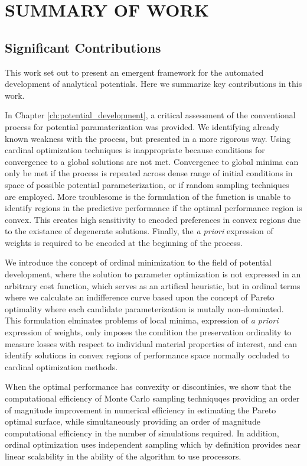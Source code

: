 \chapter{SUMMARY OF WORK}
\label{ch:summary}

\section{Significant Contributions}
This work set out to present an emergent framework for the automated development of analytical potentials.  Here we summarize key contributions in this work.

In Chapter \ref{ch:potential_development}, a critical assessment of the conventional process for potential paramaterization was provided.  We identifying already known weakness with the process, but presented in a more rigorous way.  Using cardinal optimization techniques is inappropriate because conditions for convergence to a global solutions are not met.  Convergence to global minima can only be met if the process is repeated across dense range of initial conditions in space of possible potential parameterization, or if random sampling techniques are employed.  More troublesome is the formulation of the function is unable to identify regions in the predictive performance if the optimal performance region is convex.  This creates high sensitivity to encoded preferences in convex regions due to the existance of degenerate solutions.  Finally, the \emph{a priori} expression of weights is required to be encoded at the beginning of the process.

We introduce the concept of ordinal minimization to the field of potential development, where the solution to parameter optimization is not expressed in an arbitrary cost function, which serves as an artifical heuristic, but in ordinal terms where we calculate an indifference curve based upon the concept of Pareto optimality where each candidate parameterization is mutally non-dominated.  This formulation elminates problems of local minima, expression of \emph{a priori} expression of weights, only imposes the condition the preservation ordinality to measure losses with respect to individual material properties of interest, and can identify solutions in convex regions of performance space normally occluded to cardinal optimization methods.

When the optimal performance has convexity or discontinies, we show that the computational efficiency of Monte Carlo sampling techniquqes providing an order of magnitude improvement in  numerical efficiency in estimating the Pareto optimal surface, while simultaneously providing an order of magnitude computational efficiency in the number of simulations required.  In addition, ordinal optimization uses independent sampling which by definition provides near linear scalability in the ability of the algorithm to use processors.

